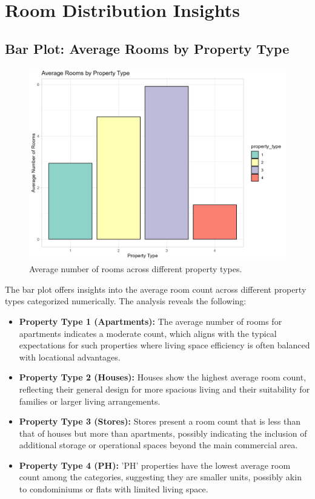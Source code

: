\documentclass{article}
\begin{document}
\section{Room Distribution Insights}
\subsection{Bar Plot: Average Rooms by Property Type}
\begin{figure}[H]
\centering
\includegraphics[width=\textwidth]{PS6c_Olubayode.png}
\caption{Average number of rooms across different property types.}
\end{figure}

The bar plot offers insights into the average room count across different property types categorized numerically. The analysis reveals the following:
\begin{itemize}
\item \textbf{Property Type 1 (Apartments):} The average number of rooms for apartments indicates a moderate count, which aligns with the typical expectations for such properties where living space efficiency is often balanced with locational advantages.
\item \textbf{Property Type 2 (Houses):} Houses show the highest average room count, reflecting their general design for more spacious living and their suitability for families or larger living arrangements.
\item \textbf{Property Type 3 (Stores):} Stores present a room count that is less than that of houses but more than apartments, possibly indicating the inclusion of additional storage or operational spaces beyond the main commercial area.
\item \textbf{Property Type 4 (PH):} 'PH' properties have the lowest average room count among the categories, suggesting they are smaller units, possibly akin to condominiums or flats with limited living space.
\end{itemize}
\end{document}

